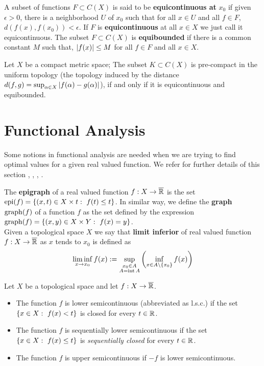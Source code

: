 A subset of functions $F\subset C(X)$ is said to be \textbf{equicontinuous at} $x_0$ if given $\epsilon>0$, there is a neighborhood $U$ of $x_0$ such that for all $x\in U$ and all $f\in F$, $d(f(x), f(x_0))<\epsilon$. If $F$ is \textbf{equicontinuous} at all $x\in X$ we just call it equicontinuous. The subset $F\subset C(X)$ is \textbf{equibounded} if there is a common constant $M$ such that, $\left| f(x) \right|\leq M$ for all $f\in F$ and all $x\in X$.
\begin{theorem}
	Let $X$ be a compact metric space;  The subset $K\subset C(X)$ is pre-compact in the uniform topology (the topology induced by the distance $d(f,g)=\sup_{\alpha\in X} \left| f(\alpha)-g(\alpha) \right|$), if and only if it is equicontinuous and equibounded.
\end{theorem}

\section{Functional Analysis}
Some notions in functional analysis are needed when we are trying to find optimal values for a given real valued function. We refer for further details of this section \cite{Barbu2012Optimization}, \cite{Fonseca2007ModCalculculusofVar}, \cite{Kreyszig1978FAME}, \cite{Clarke2013FAME}.  

The \textbf{epigraph} of a real valued function $f:X\rightarrow \overline{\mathbb{R}}$ is the set $\mathrm{epi}(f)=\left\lbrace (x,t)\in X\times t:\ f(t)\leq t \right\rbrace$. In similar way, we define the \textbf{graph} $\mathrm{graph}(f)$ of a function $f$ as the set defined by the expression $\graph(f)=\braces{(x,y)\in X\times Y:\ f(x)=y}$. \\
Given a topological space $X$ we say that \textbf{limit inferior} of real valued function $f:X\rightarrow \overline{\mathbb{R}}$ as $x$ tends to $x_0$ is defined as
\begin{equation*}
	\liminf_{x\rightarrow x_0} f(x):=\sup_{\substack{x_0\in A\\A=\mathrm{int}\, A}} \left( \inf_{x\in A\backslash \left\lbrace x_0 \right\rbrace} f(x) \right)
\end{equation*}
\begin{definition}
	\label{def: l.s.c.}
	Let $X$ be a topological space and let $f:X\rightarrow \overline{\mathbb{R}}$.
	\begin{itemize}
		\item The function $f$ is lower semicontinuous (abbreviated as l.s.c.) if the set $\left\lbrace x\in X:\ f(x)<t \right\rbrace$ is closed for every $t\in \mathbb{R}$.
		\item The function $f$ is sequentially lower semicontinuous if the set $\left\lbrace x \in X:\ f(x)\leq t \right\rbrace$ is \emph{sequentially closed} for every $t\in \mathbb{R}$.
		\item The function $f$ is upper semicontinuous if $-f$ is lower semicontinuous.   
	\end{itemize}
\end{definition}	 

